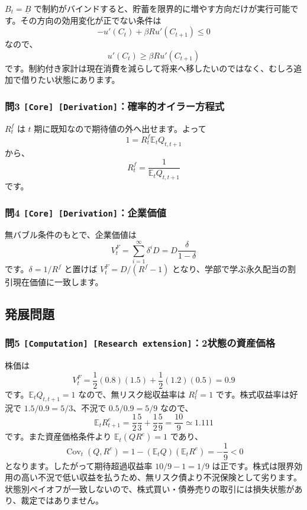 \documentclass[
  japanese,
  lualatex,
  ja=standard,
  11pt,
  a4paper]{ltjsarticle}
\begin{document}
\(B_t=\underline B\)
で制約がバインドすると、貯蓄を限界的に増やす方向だけが実行可能です。その方向の効用変化が正でない条件は
\[
-u'(C_t)+\beta R u'(C_{t+1})\leq0
\] なので、 \[
u'(C_t)\geq\beta R u'(C_{t+1})
\]
です。制約付き家計は現在消費を減らして将来へ移したいのではなく、むしろ追加で借りたい状態にあります。

\subsubsection{\texorpdfstring{問3
\texttt{{[}Core{]}\ {[}Derivation{]}}：確率的オイラー方程式}{問3 {[}Core{]} {[}Derivation{]}：確率的オイラー方程式}}\label{ux554f3-core-derivationux78baux7387ux7684ux30aaux30a4ux30e9ux30fcux65b9ux7a0bux5f0f}

\(R_t^f\) は \(t\) 期に既知なので期待値の外へ出せます。よって \[
1=R_t^f\mathbb E_tQ_{t,t+1}
\] から、 \[
R_t^f=\frac{1}{\mathbb E_tQ_{t,t+1}}
\] です。

\subsubsection{\texorpdfstring{問4
\texttt{{[}Core{]}\ {[}Derivation{]}}：企業価値}{問4 {[}Core{]} {[}Derivation{]}：企業価値}}\label{ux554f4-core-derivationux4f01ux696dux4fa1ux5024}

無バブル条件のもとで、企業価値は \[
V_t^F
=\sum_{i=1}^{\infty}\delta^iD
=D\frac{\delta}{1-\delta}
\] です。\(\delta=1/R^f\) と置けば \(V_t^F=D/(R^f-1)\)
となり、学部で学ぶ永久配当の割引現在価値に一致します。

\subsection{発展問題}\label{ux767aux5c55ux554fux984c-2}

\subsubsection{\texorpdfstring{問5
\texttt{{[}Computation{]}\ {[}Research\ extension{]}}：2状態の資産価格}{問5 {[}Computation{]} {[}Research extension{]}：2状態の資産価格}}\label{ux554f5-computation-research-extension2ux72b6ux614bux306eux8cc7ux7523ux4fa1ux683c}

株価は \[
V_t^F
=\frac12(0.8)(1.5)+\frac12(1.2)(0.5)
=0.9
\] です。\(\mathbb E_tQ_{t,t+1}=1\) なので、無リスク総収益率は
\(R_t^f=1\) です。株式収益率は好況で \(1.5/0.9=5/3\)、不況で
\(0.5/0.9=5/9\) なので、 \[
\mathbb E_tR_{t+1}^e
=\frac12\frac53+\frac12\frac59
=\frac{10}{9}\simeq1.111
\] です。また資産価格条件より \(\mathbb E_t(QR^e)=1\) であり、 \[
\operatorname{Cov}_t(Q,R^e)
=1-(\mathbb E_tQ)(\mathbb E_tR^e)
=-\frac19<0
\] となります。したがって期待超過収益率 \(10/9-1=1/9\)
は正です。株式は限界効用の高い不況で低い収益を払うため、無リスク債より不況保険として劣ります。状態別ペイオフが一致しないので、株式買い・債券売りの取引には損失状態があり、裁定ではありません。
\end{document}
